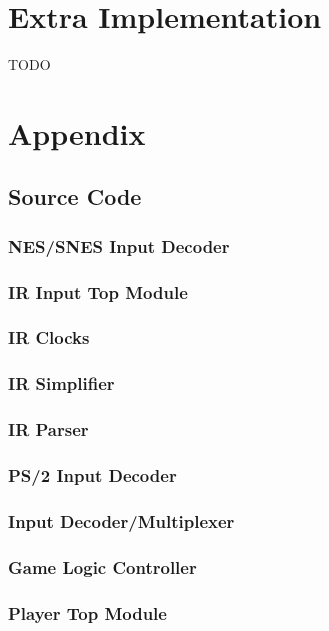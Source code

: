 \documentclass[]{article}
\begin{document}
\section{Extra Implementation}
TODO

\section{Appendix}
\subsection{Source Code}
\subsubsection{NES/SNES Input Decoder}

\subsubsection{IR Input Top Module}

\subsubsection{IR Clocks}

\subsubsection{IR Simplifier}

\subsubsection{IR Parser}

\subsubsection{PS/2 Input Decoder}

\subsubsection{Input Decoder/Multiplexer}

\subsubsection{Game Logic Controller}

\subsubsection{Player Top Module}

\end{document}

